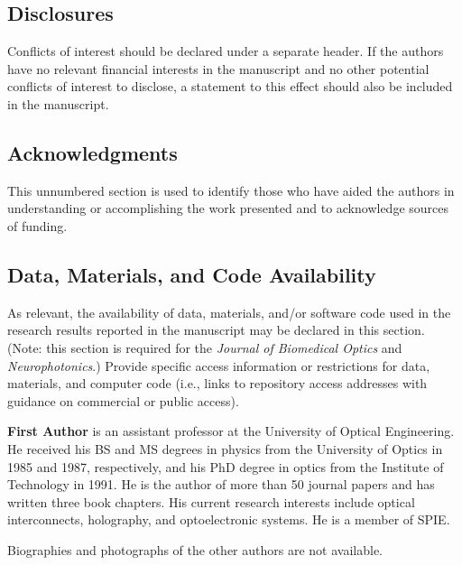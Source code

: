 \documentclass[12pt]{spieman}  %
\begin{document}
\begin{spacing}{2}
\vspace{2ex}

\subsection*{Disclosures}
Conflicts of interest should be declared under a separate header. If the authors have no relevant financial interests in the manuscript and no other potential conflicts of interest to disclose, a statement to this effect should also be included in the manuscript.

\subsection* {Acknowledgments}
This unnumbered section is used to identify those who have aided the authors in understanding or accomplishing the work presented and to acknowledge sources of funding.

\subsection* {Data, Materials, and Code Availability}
As relevant, the availability of data, materials, and/or software code used in the research results reported in the manuscript may be declared in this section. (Note: this section is required for the \textit{Journal of Biomedical Optics} and \textit{Neurophotonics}.) Provide specific access information or restrictions for data, materials, and computer code (i.e., links to repository access addresses with guidance on commercial or public access).





\vspace{2ex}\noindent\textbf{First Author} is an assistant professor at the University of Optical Engineering. He received his BS and MS degrees in physics from the University of Optics in 1985 and 1987, respectively, and his PhD degree in optics from the Institute of Technology in 1991.  He is the author of more than 50 journal papers and has written three book chapters. His current research interests include optical interconnects, holography, and optoelectronic systems. He is a member of SPIE.

\vspace{1ex}
\noindent Biographies and photographs of the other authors are not available.

\listoffigures
\listoftables

\end{spacing}
\end{document}
